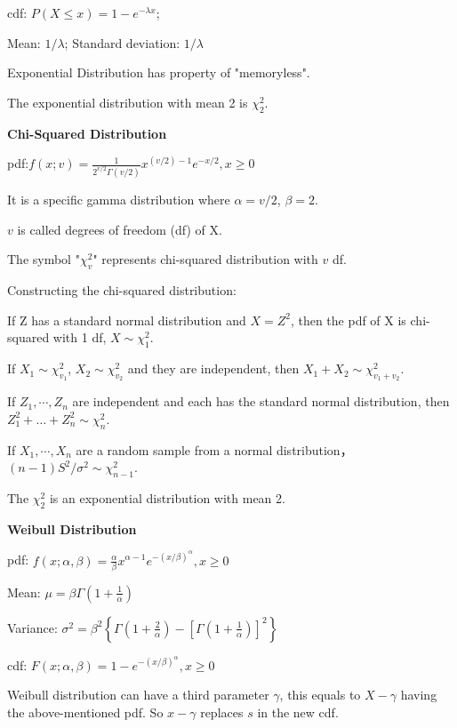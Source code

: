 \documentclass{article}
\newcommand{\bigtitle}[1]{
	\noindent
	\textbf{#1}
}
\begin{document}
	
	cdf: $P(X\leq x) = 1-e^{-\lambda x}$;
	
	Mean: $1/\lambda$; 
	Standard deviation: $1/\lambda$
	
	Exponential Distribution has property of "memoryless".
	
	The exponential distribution with mean 2 is $\chi_2^2$.
	
	
	
	\bigtitle{Chi-Squared Distribution}
	
	pdf:$
	f(x;v) =
	\frac{1}{2^{v/2}\Gamma(v/2)}x^{(v/2)-1}e^{-x/2}, x\geq 0
	$
	
	It is a specific gamma distribution where $\alpha = v/2$, $\beta = 2$.
	
	$v$ is called degrees of freedom (df) of X.
	
	\noindent
	The symbol "$\chi_v^2$" represents chi-squared distribution with $v$ df.
	
	
	
	
	Constructing the chi-squared distribution:

	If Z has a standard normal distribution and $ X = Z^2 $, then the pdf of X is chi-squared with 1 df, $X \sim \chi_1^2 $.
	
	If $ X_1 \sim \chi_{v_1}^2$, $X_2 \sim \chi_{v_2}^2$ and they are independent, then $X_1 +X_2 \sim \chi_{v_1+v_2}^2$.
	
	If $Z_1, \cdots , Z_n$ are independent and each has the standard normal distribution, then $Z_1^2 +\dots + Z_n^2 \sim \chi_n^2$.
	
	If $X_1, \cdots , X_n$ are a random sample from a normal distribution， $(n-1)S^2/\sigma^2 \sim \chi_{n-1}^2$.
	
	The $\chi_2^2$ is an exponential distribution with mean 2.
	
	
	
	
	\bigtitle{Weibull Distribution}
	
	pdf:
	$
	f(x;\alpha,\beta) = 
	\frac{\alpha}{\beta}x^{\alpha-1}e^{-(x/\beta)^\alpha}
	, x\geq 0 
	$
	
	Mean: $\mu = \beta\Gamma(1+\frac{1}{\alpha})$
	
	Variance: $\sigma^2 = \beta^2\left\lbrace \Gamma\left( 1+\frac{2}{\alpha}\right)-\left[ \Gamma\left(1+\frac{1}{\alpha}\right)\right] ^2\right\rbrace$
	
	cdf:
	$
	F(x;\alpha,\beta) = 1-e^{-(x/\beta)^\alpha}
	, x\geq 0
	$
	
	
	Weibull distribution can have a third parameter $\gamma$, this equals to $X-\gamma$ having the above-mentioned pdf. So $x-\gamma$ replaces $s$ in the new cdf.
	
\end{document}

